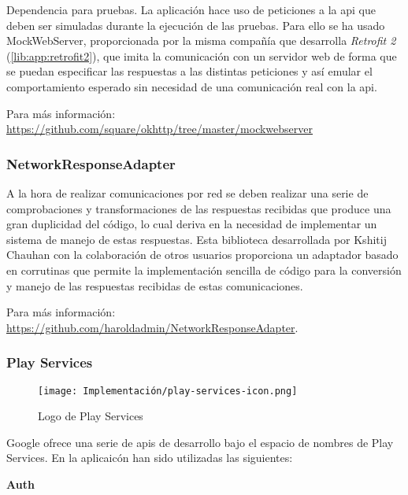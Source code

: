 Dependencia para pruebas. La aplicación hace uso de peticiones a la \acrshort{api} que deben ser simuladas durante la ejecución de las pruebas. Para ello se ha usado MockWebServer, proporcionada por la misma compañía que desarrolla \emph{Retrofit 2} (\ref{lib:app:retrofit2}), que imita la comunicación con un servidor web de forma que se puedan especificar las respuestas a las distintas peticiones y así emular el comportamiento esperado sin necesidad de una comunicación real con la \acrshort{api}.

Para más información: \href{https://github.com/square/okhttp/tree/master/mockwebserver}{https://github.com/square/okhttp/tree/master/mockwebserver}

\subsubsection{NetworkResponseAdapter}

A la hora de realizar comunicaciones por red se deben realizar una serie de comprobaciones y transformaciones de las respuestas recibidas que produce una gran duplicidad del código, lo cual deriva en la necesidad de implementar un sistema de manejo de estas respuestas. Esta biblioteca desarrollada por Kshitij Chauhan con la colaboración de otros usuarios proporciona un adaptador basado en corrutinas que permite la implementación sencilla de código para la conversión y manejo de las respuestas recibidas de estas comunicaciones.

Para más información: \href{https://github.com/haroldadmin/NetworkResponseAdapter}{https://github.com/haroldadmin/NetworkResponseAdapter}.

\subsubsection{Play Services}

\begin{wrapfigure}[4]{r}{0.2\textwidth}
    \vspace{-60pt}
    \centering
    \texttt{[image: Implementación/play-services-icon.png]}
    \vspace{-15pt}
    \caption{Logo de Play Services}
\end{wrapfigure}

Google ofrece una serie de \acrshort{api}s de desarrollo bajo el espacio de nombres de Play Services. En la aplicaicón han sido utilizadas las siguientes:

\textbf{Auth}
\label{lib:app:auth}

